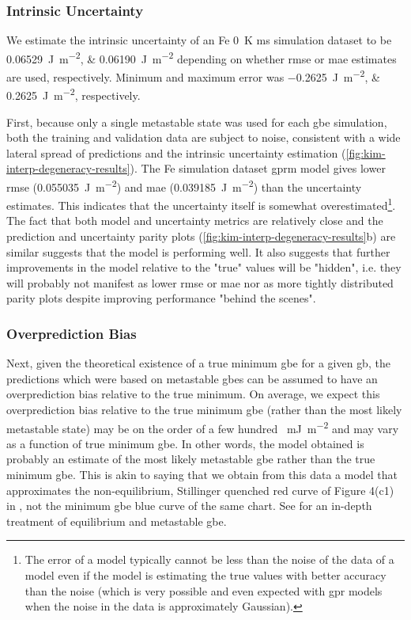 \documentclass[final,twocolumn,12pt]{elsarticle}
\begin{document}
	\subsubsection{Intrinsic Uncertainty} \label{sec:results:lit:error}
	We estimate the intrinsic uncertainty of an Fe \SI{0}{\kelvin} \gls{ms} simulation dataset to be \SIlist{0.06529;0.06190}{\joule\per\square\meter} depending on whether \gls{rmse} or \gls{mae} estimates are used, respectively. Minimum and maximum error was \SIlist{-0.2625;0.2625}{\joule\per\square\meter}, respectively.

	First, because only a single metastable state was used for each \gls{gbe} simulation, both the training and validation data are subject to noise, consistent with a wide lateral spread of predictions and the intrinsic uncertainty estimation (\cref{fig:kim-interp-degeneracy-results}). The Fe simulation dataset \gls{gprm} model gives lower \gls{rmse} (\SI{0.055035}{\joule\per\square\meter}) and \gls{mae} (\SI{0.039185}{\joule\per\square\meter}) than the uncertainty estimates. This indicates that the uncertainty itself is somewhat overestimated\footnote{The \outpt{} error of a model typically cannot be less than the noise of the \outpt{} data of a model even if the model is estimating the true \outpt{} values with better accuracy than the noise (which is very possible and even expected with \gls{gpr} models when the noise in the \inpt{} data is approximately Gaussian).}. The fact that both model and uncertainty metrics are relatively close and the prediction \cite{bairdFiveDegreeofFreedomPropertyUnderReview} and uncertainty parity plots (\cref{fig:kim-interp-degeneracy-results}b) are similar suggests that the model is performing well. It also suggests that further improvements in the model relative to the "true" values will be "hidden", i.e. they will probably not manifest as lower \gls{rmse} or \gls{mae} nor as more tightly distributed parity plots despite improving performance "behind the scenes".

    \subsubsection{Overprediction Bias} \label{sec:results:lit:overprediction}
	Next, given the theoretical existence of a true minimum \gls{gbe} for a given \gls{gb}, the predictions which were based on metastable \glspl{gbe} can be assumed to have an overprediction bias relative to the true minimum. On average, we expect this overprediction bias relative to the true minimum \gls{gbe} (rather than the most likely metastable state) may be on the order of a few hundred \SI{}{\milli\J\per\square\m} and may vary as a function of true minimum \gls{gbe}. In other words, the model obtained is probably an estimate of the most likely metastable \gls{gbe} rather than the true minimum \gls{gbe}. This is akin to saying that we obtain from this data a model that approximates the non-equilibrium, Stillinger quenched red curve of Figure 4(c1) in \cite{hanGrainboundaryMetastabilityIts2016}, not the minimum \gls{gbe} blue curve of the same chart. See \cite{hanGrainboundaryMetastabilityIts2016} for an in-depth treatment of equilibrium and metastable \gls{gbe}.
\end{document}
